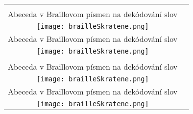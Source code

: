 \documentclass[10pt]{report}
\begin{document}
\begin{tabular}{c c}
\begin{minipage}{0.49\textwidth}
\begin{center}
\phantom{x}\\[10mm]
{\Large Abeceda v Braillovom písmen na dekódování slov}\\[1mm]
\texttt{[image: brailleSkratene.png]}
\end{center}
\end{minipage}
&
\begin{minipage}{0.49\textwidth}
\begin{center}
\phantom{x}\\[10mm]
{\Large Abeceda v Braillovom písmen na dekódování slov}\\[1mm]
\texttt{[image: brailleSkratene.png]}
\end{center}
\end{minipage}
\\
\begin{minipage}{0.49\textwidth}
\begin{center}
\phantom{x}\\[10mm]
{\Large Abeceda v Braillovom písmen na dekódování slov}\\[1mm]
\texttt{[image: brailleSkratene.png]}
\end{center}
\end{minipage}
&
\begin{minipage}{0.49\textwidth}
\begin{center}
\phantom{x}\\[10mm]
{\Large Abeceda v Braillovom písmen na dekódování slov}\\[1mm]
\texttt{[image: brailleSkratene.png]}
\end{center}
\end{minipage}

\end{tabular}
\clearpage
\setlength{\tabcolsep}{4mm}
\end{document}
